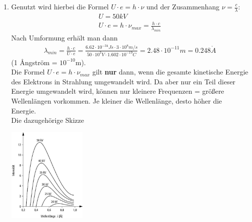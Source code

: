 \documentclass[12pt,a4paper,ngerman]{article}
\begin{document}
\begin{enumerate}
\item
Genutzt wird hierbei die Formel $U \cdot e = h \cdot \nu$ und der Zusammenhang $\nu = \frac{c}{\lambda}$:
 \begin{align*}
U = 50kV \\
U \cdot e = h \cdot \nu_{max} = \frac{h \cdot c}{\lambda_{min}}
\end{align*}
Nach Umformung erhält man dann
\begin{align*}
\lambda_{min} = \frac{h \cdot c}{U \cdot e} = \frac{6.62\cdot 10^{-34} Js \cdot 3 \cdot 10^8m/s}{50\cdot 10^3V \cdot 1.602 \cdot 10^{-19}C} = 2.48\cdot 10^{-11} m = 0.248 \mathring{A}
\end{align*}
(1 \AA ngström = $10^{-10}$m). \\
Die Formel $U \cdot e = h \cdot \nu_{max}$ gilt \textbf{nur} dann, wenn die gesamte kinetische Energie des Elektrons in Strahlung umgewandelt wird. Da aber nur ein Teil dieser Energie umgewandelt wird, können nur kleinere Frequenzen = größere Wellenlängen vorkommen. Je kleiner die Wellenlänge, desto höher die Energie. 
\pagebreak
\\
Die dazugehörige Skizze
\begin{center}
\includegraphics[width=0.3\textwidth]{roentgen.png} 
\end{center}



\end{enumerate}
\end{document}

